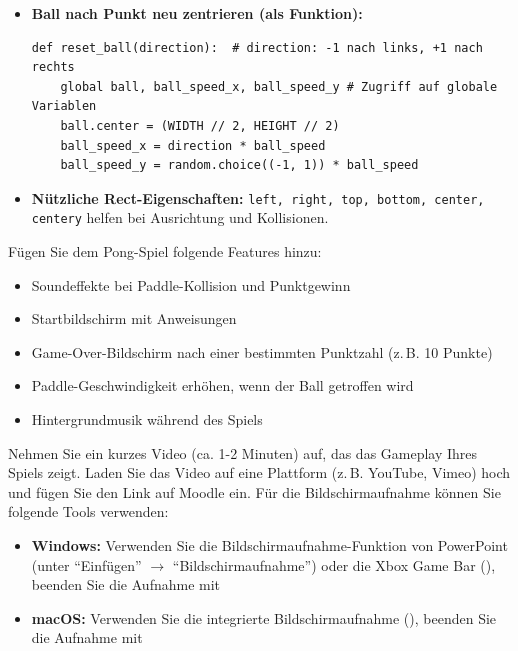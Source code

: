 \begin{myattention}
\begin{itemize}
        \item \textbf{Ball nach Punkt neu zentrieren (als Funktion):}
              \begin{lstlisting}
def reset_ball(direction):  # direction: -1 nach links, +1 nach rechts
    global ball, ball_speed_x, ball_speed_y # Zugriff auf globale Variablen
    ball.center = (WIDTH // 2, HEIGHT // 2)
    ball_speed_x = direction * ball_speed
    ball_speed_y = random.choice((-1, 1)) * ball_speed
\end{lstlisting}

        \item \textbf{Nützliche Rect-Eigenschaften:} \lstinline|left, right, top, bottom, center, centery| helfen bei Ausrichtung und Kollisionen.
    \end{itemize}
\end{myattention}

\begin{mychallenge}
    Fügen Sie dem Pong-Spiel folgende Features hinzu:
    \begin{itemize}
        \item Soundeffekte bei Paddle-Kollision und Punktgewinn
        \item Startbildschirm mit Anweisungen
        \item Game-Over-Bildschirm nach einer bestimmten Punktzahl (z.\,B. 10 Punkte)
        \item Paddle-Geschwindigkeit erhöhen, wenn der Ball getroffen wird
        \item Hintergrundmusik während des Spiels
    \end{itemize}
\end{mychallenge}

\begin{myexercise}
    Nehmen Sie ein kurzes Video (ca. 1-2 Minuten) auf, das das Gameplay Ihres Spiels zeigt. Laden Sie das Video auf eine Plattform (z.\,B. YouTube, Vimeo) hoch und fügen Sie den Link auf Moodle ein. Für die Bildschirmaufnahme können Sie folgende Tools verwenden:

    \begin{itemize}
        \item \textbf{Windows:} Verwenden Sie die Bildschirmaufnahme-Funktion von PowerPoint (unter \enquote{Einfügen} $\rightarrow$ \enquote{Bildschirmaufnahme}) oder die Xbox Game Bar (), beenden Sie die Aufnahme mit 
        \item \textbf{macOS:} Verwenden Sie die integrierte Bildschirmaufnahme (), beenden Sie die Aufnahme mit 
    \end{itemize}
\end{myexercise}

